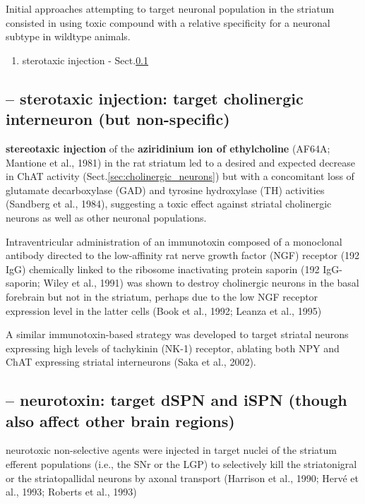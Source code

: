 Initial approaches attempting to target neuronal population in the striatum
consisted in using toxic compound with a relative specificity for a neuronal
subtype in wildtype animals.
\begin{enumerate}
  \item sterotaxic injection - Sect.\ref{sec:sterotaxic-injection}
\end{enumerate}

\subsection{-- sterotaxic injection: target cholinergic interneuron (but
non-specific)}
\label{sec:sterotaxic-injection}

{\bf stereotaxic injection} of the {\bf aziridinium ion of ethylcholine} (AF64A;
Mantione et al., 1981) in the rat striatum led to a desired and expected
decrease in ChAT activity (Sect.\ref{sec:cholinergic_neurons}) but with a
concomitant loss of glutamate decarboxylase (GAD) and tyrosine hydroxylase (TH)
activities (Sandberg et al., 1984), suggesting a toxic effect against striatal
cholinergic neurons as well as other neuronal populations.


Intraventricular administration of an immunotoxin composed of a
monoclonal antibody directed to the low-affinity rat nerve growth factor (NGF)
receptor (192 IgG) chemically linked to the ribosome inactivating protein
saporin (192 IgG-saporin; Wiley et al., 1991) was shown to destroy cholinergic
neurons in the basal forebrain but not in the striatum, perhaps due to the low
NGF receptor expression level in the latter cells (Book et al., 1992; Leanza
et al., 1995)

A similar immunotoxin-based strategy was developed to target striatal
neurons expressing high levels of tachykinin (NK-1) receptor, ablating both
NPY and ChAT expressing striatal interneurons (Saka et al., 2002).  
  

\subsection{-- neurotoxin: target dSPN and iSPN (though also affect other brain
regions)}
\label{sec:neurotoxin}
  
neurotoxic non-selective agents were injected in target nuclei of the
striatum efferent populations (i.e., the SNr or the LGP) to selectively kill
the striatonigral or the striatopallidal neurons by axonal transport (Harrison
et al., 1990; Hervé et al., 1993; Roberts et al., 1993)  
  
